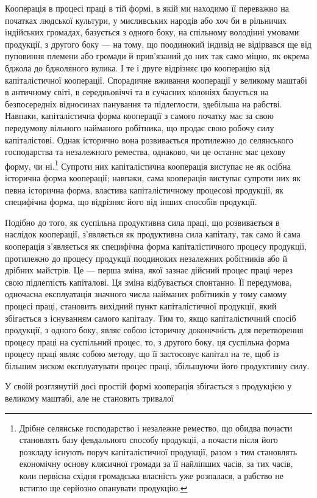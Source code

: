 Кооперація в процесі праці в тій формі, в якій ми находимо
її переважно на початках людської культури, у мисливських народів або хоч би в рільничих індійських громадах, базується
з одного боку, на спільному володінні умовами продукції, з другого
боку — на тому, що поодинокий індивід не відірвався ще від
пуповиння племени або громади й прив’язаний до них так само
міцно, як окрема бджола до бджоляного вулика. І те і друге відрізняє
цю кооперацію від капіталістичної кооперації. Спорадичне
вживання кооперації у великому маштабі в античному світі, в
середньовіччі та в сучасних колоніях базується на безпосередніх
відносинах панування та підлеглости, здебільша на рабстві.
Навпаки, капіталістична форма кооперації з самого початку має
за свою передумову вільного найманого робітника, що продає
свою робочу силу капіталістові. Однак історично вона розвивається
протилежно до селянського господарства та незалежного
ремества, однаково, чи це останнє має цехову форму, чи ні.\footnote{
Дрібне селянське господарство і незалежне ремество, що обидва
почасти становлять базу февдального способу продукції, а почасти після
його розкладу існують поруч капіталістичної продукції, разом з тим становлять
економічну основу клясичної громади за її найліпших часів, за
тих часів, коли первісна східня громадська власність уже розпалася, а
рабство не встигло ще серйозно опанувати продукцію.
}
Супроти них капіталістична кооперація виступає не як осібна
історична форма кооперації; навпаки, сама кооперація виступає
супроти них як певна історична форма, властива капіталістичному
процесові продукції, як специфічна форма, що відрізняє
його від інших способів продукції.

Подібно до того, як суспільна продуктивна сила праці, що
розвивається в наслідок кооперації, з’являється як продуктивна
сила капіталу, так само й сама кооперація з’являється як специфічна
форма капіталістичного процесу продукції, протилежно до
процесу продукції поодиноких незалежних робітників або й дрібних
майстрів. Це — перша зміна, якої зазнає дійсний процес
праці через свою підлеглість капіталові. Ця зміна відбувається
спонтанно. Її передумова, одночасна експлуатація значного
числа найманих робітників у тому самому процесі праці, становить
вихідний пункт капіталістичної продукції, який збігається
з існуванням самого капіталу. Тим то, якщо капіталістичний
спосіб продукції, з одного боку, являє собою історичну доконечність
для перетворення процесу праці на суспільний процес, то,
з другого боку, ця суспільна форма процесу праці являє собою
методу, що її застосовує капітал на те, щоб із більшим зиском
експлуатувати процес праці, збільшуючи його продуктивну силу.

У своїй розглянутій досі простій формі кооперація збігається
з продукцією у великому маштабі, але не становить тривалої
\parbreak{}  %
